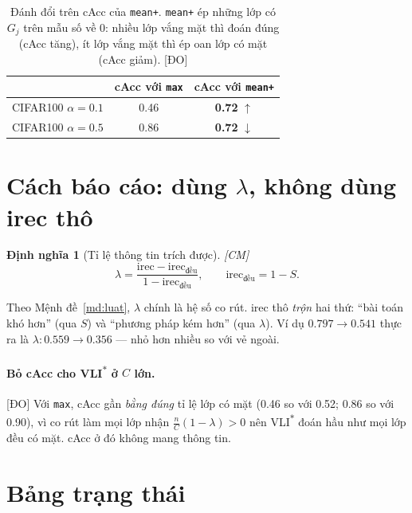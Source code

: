 \documentclass[11pt,a4paper]{article}
\newtheorem{dinhnghia}[dinhly]{Định nghĩa}
\theoremstyle{remark}
\newcommand{\code}[1]{\texttt{\small #1}}
\newcommand{\CM}{\textsf{[CM]}}
\newcommand{\DO}{\textsf{[ĐO]}}
\begin{document}
\begin{table}[htbp]
\centering
\caption{Đánh đổi trên cAcc của \code{mean+}. \code{mean+} ép những lớp có $G_j$
trên mẫu số về 0: nhiều lớp vắng mặt thì đoán đúng (cAcc tăng), ít lớp vắng mặt
thì ép oan lớp có mặt (cAcc giảm). \DO}
\label{tab:cacc}
\small
\begin{tabular}{@{}lcc@{}}
\toprule
 & cAcc với \code{max} & cAcc với \code{mean+} \\
\midrule
CIFAR100 $\alpha=0.1$ & 0.46 & \textbf{0.72} $\uparrow$ \\
CIFAR100 $\alpha=0.5$ & 0.86 & \textbf{0.72} $\downarrow$ \\
\bottomrule
\end{tabular}
\end{table}

\section{Cách báo cáo: dùng $\lambda$, không dùng irec thô}
\label{sec:baocao}

\begin{dinhnghia}[Tỉ lệ thông tin trích được] \CM
\[
  \lambda=\frac{\mathrm{irec}-\mathrm{irec}_{\text{đều}}}{1-\mathrm{irec}_{\text{đều}}},
  \qquad \mathrm{irec}_{\text{đều}}=1-S .
\]
\end{dinhnghia}

Theo Mệnh đề~\ref{md:luat}, $\lambda$ chính là hệ số co rút. irec thô
\emph{trộn} hai thứ: ``bài toán khó hơn'' (qua $S$) và ``phương pháp kém hơn''
(qua $\lambda$). Ví dụ $0.797\to0.541$ thực ra là $\lambda:0.559\to0.356$ ---
nhỏ hơn nhiều so với vẻ ngoài.

\paragraph{Bỏ cAcc cho VLI\textsuperscript{$*$} ở $C$ lớn.} \DO{} Với
\code{max}, cAcc gần \emph{bằng đúng} tỉ lệ lớp có mặt (0.46 so với 0.52;
0.86 so với 0.90), vì co rút làm mọi lớp nhận $\frac nC(1-\lambda)>0$ nên
VLI\textsuperscript{$*$} đoán hầu như mọi lớp đều có mặt. cAcc ở đó không mang
thông tin.

\section{Bảng trạng thái}
\end{document}
